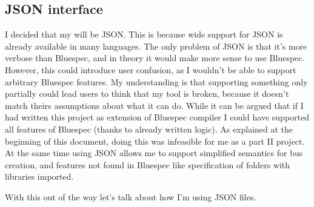 \documentclass[14pt]{report}
\begin{document}
\subsection{JSON interface}
I decided that my  will be JSON. This is because wide support for JSON is already available in many languages. 
The only problem of JSON is that it's more verbose than Bluespec, and in theory it would make more sense to use Bluespec. 
However, this could introduce user confusion, as I wouldn't be able to support arbitrary Bluespec features.
My understanding is that supporting something only partially could lead users to think that my tool is broken, because it doesn't match theirs assumptions about what it can do. 
While it can be argued that if I had written this project as extension of Bluespec compiler I could have supported all features of Bluespec (thanks to already written logic). 
As explained at the beginning of this document, doing this was infeasible for me as a part II project. 
At the same time using JSON allows me to support simplified semantics for bus creation, and features not found in Bluespec like specification of folders with libraries imported.

With this out of the way let's talk about how I'm using JSON files.
\end{document}
